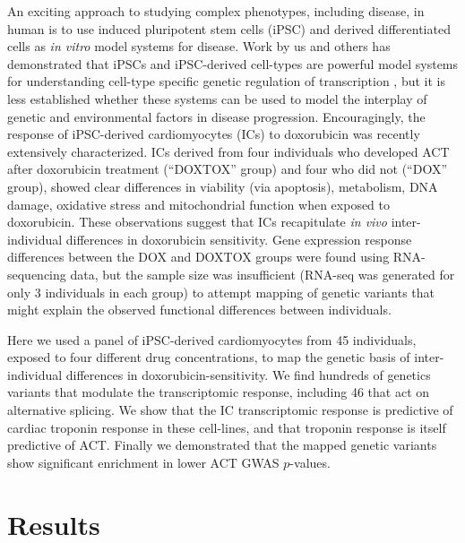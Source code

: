 \documentclass{article}
\begin{document}
An exciting approach to studying complex phenotypes, including disease, in human is to use induced pluripotent stem cells (iPSC) and derived differentiated cells as \emph{in vitro} model systems for disease. Work by us and others has demonstrated that iPSCs and iPSC-derived cell-types are powerful model systems for understanding cell-type specific genetic regulation of transcription \citep{Thomas2015,Burrows2016,Banovich091660,Kilpinen2017}, but it is less established whether these systems can be used to model the interplay of genetic and environmental factors in disease progression. Encouragingly, the response of iPSC-derived cardiomyocytes (ICs) to doxorubicin was recently extensively characterized\cite{Burridge2016}. ICs derived from four individuals who developed ACT after doxorubicin treatment (``DOXTOX'' group) and four who did not (``DOX'' group), showed clear differences in viability (via apoptosis), metabolism, DNA damage, oxidative stress and mitochondrial function when exposed to doxorubicin. These observations suggest that ICs recapitulate \emph{in vivo} inter-individual differences in doxorubicin sensitivity. Gene expression response differences between the DOX and DOXTOX groups were found using RNA-sequencing data, but the sample size was insufficient (RNA-seq was generated for only 3 individuals in each group) to attempt mapping of genetic variants that might explain the observed functional differences between individuals. 

Here we used a panel of iPSC-derived cardiomyocytes from 45 individuals, exposed to four different drug concentrations, to map the genetic basis of inter-individual differences in doxorubicin-sensitivity. We find hundreds of genetics variants that modulate the  transcriptomic response, including 46 that act on alternative splicing. We show that the IC transcriptomic response is predictive of cardiac troponin response in these cell-lines, and that troponin response is itself predictive of ACT. Finally we demonstrated that the mapped genetic variants show significant enrichment in lower ACT GWAS $p$-values. 

\section*{Results}
\end{document}

